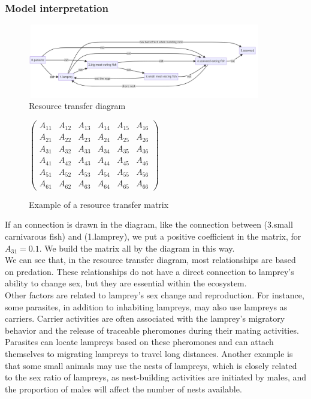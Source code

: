 \documentclass[12pt]{article}
\begin{document}
\subsubsection{Model interpretation}
\begin{figure}[h]
	\centering
	\includegraphics[width=0.9\textwidth]{Q4_EnvStructure.png}
	\caption{Resource transfer diagram}
\end{figure}
\begin{figure}[h]
	\centering
	$\begin{pmatrix}
			A_{11} & A_{12} & A_{13} & A_{14} & A_{15} & A_{16} \\
			A_{21} & A_{22} & A_{23} & A_{24} & A_{25} & A_{26} \\
			A_{31} & A_{32} & A_{33} & A_{34} & A_{35} & A_{36} \\
			A_{41} & A_{42} & A_{43} & A_{44} & A_{45} & A_{46} \\
			A_{51} & A_{52} & A_{53} & A_{54} & A_{55} & A_{56} \\
			A_{61} & A_{62} & A_{63} & A_{64} & A_{65} & A_{66}
		\end{pmatrix}$
	\caption*{Example of a resource transfer matrix}
\end{figure}
If an connection is drawn in the diagram, like the connection between (3.small carnivarous 
fish) and (1.lamprey), we put a positive coefficient in the matrix, for $A_{31} = 0.1$. 
We build the matrix all by the diagram in this way. \\
We can see that, in the resource transfer diagram, most relationships are based on predation. 
These relationships do not have a direct connection to lamprey's ability to change sex, but 
they are essential within the ecosystem.\\
Other factors are related to lamprey's sex change and reproduction. For instance, some parasites, 
in addition to inhabiting lampreys, may also use lampreys as carriers. Carrier activities are 
often associated with the lamprey's migratory behavior and the release of traceable pheromones 
during their mating activities. Parasites can locate lampreys based on these pheromones and 
can attach themselves to migrating lampreys to travel long distances. Another example is that 
some small animals may use the nests of lampreys, which is closely related to the sex ratio of 
lampreys, as nest-building activities are initiated by males, and the proportion of males will 
affect the number of nests available. 
\end{document}
